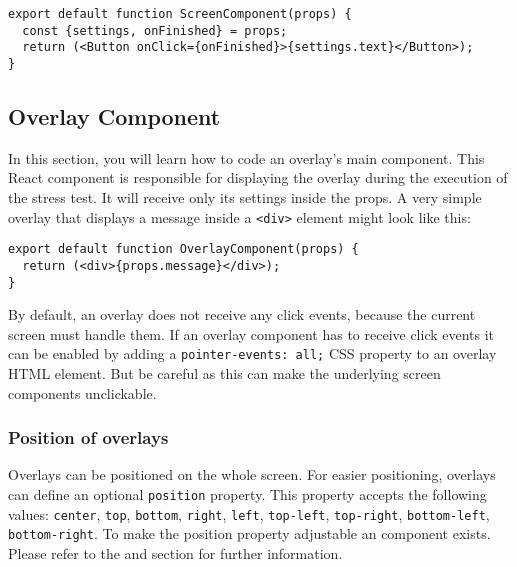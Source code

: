 \begin{verbatim}
export default function ScreenComponent(props) {
  const {settings, onFinished} = props;
  return (<Button onClick={onFinished}>{settings.text}</Button>);
}
\end{verbatim}

\subsection{Overlay Component}
\label{sec:development-overlays}
In this section, you will learn how to code an overlay's main component. 
This React component is responsible for displaying the overlay during the execution of the stress test. 
It will receive only its settings inside the props. 
A very simple overlay that displays a message inside a \texttt{<div>} element might look like this:
\begin{verbatim}
export default function OverlayComponent(props) {
  return (<div>{props.message}</div>);
}
\end{verbatim}

By default, an overlay does not receive any click events, because the current screen must handle them. 
If an overlay component has to receive click events it can be enabled by adding a \texttt{pointer-events: all;} CSS property to an overlay HTML element. 
But be careful as this can make the underlying screen components unclickable.

\subsubsection*{Position of overlays}
Overlays can be positioned on the whole screen. 
For easier positioning, overlays can define an optional \texttt{position} property. 
This property accepts the following values: 
\texttt{center}, \texttt{top}, \texttt{bottom}, \texttt{right}, \texttt{left}, \texttt{top-left}, \texttt{top-right}, \texttt{bottom-left}, \texttt{bottom-right}.
To make the position property adjustable an \texttt{} component exists. 
Please refer to the  and  section for further information.

